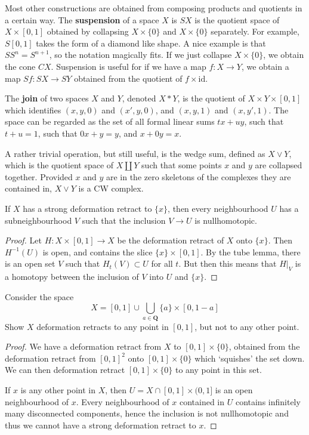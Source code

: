 Most other constructions are obtained from composing products and quotients in a certain way. The {\bf suspension} of a space $X$ is $SX$ is the quotient space of $X \times [0,1]$ obtained by collapsing $X \times \{ 0 \}$ and $X \times \{ 0 \}$ separately. For example, $S[0,1]$ takes the form of a diamond like shape. A nice example is that $SS^n = S^{n+1}$, so the notation magically fits. If we just collapse $X \times \{ 0 \}$, we obtain the cone $CX$. Suspension is useful for if we have a map $f:X \to Y$, we obtain a map $Sf: SX \to SY$ obtained from the quotient of $f \times \text{id}$.

The {\bf join} of two spaces $X$ and $Y$, denoted $X*Y$, is the quotient of $X \times Y \times [0,1]$ which identifies $(x,y,0)$ and $(x',y,0)$, and $(x,y,1)$ and $(x,y',1)$. The space can be regarded as the set of all formal linear sums $tx + uy$, such that $t + u = 1$, such that $0x + y = y$, and $x + 0y = x$.

A rather trivial operation, but still useful, is the wedge sum, defined as $X \vee Y$, which is the quotient space of $X \coprod Y$ such that some points $x$ and $y$ are collapsed together. Provided $x$ and $y$ are in the zero skeletons of the complexes they are contained in, $X \vee Y$ is a CW complex.











\begin{theorem}
    If $X$ has a strong deformation retract to $\{ x \}$, then every neighbourhood $U$ has a subneighbourhood $V$ such that the inclusion $V \to U$ is nullhomotopic.
\end{theorem}
\begin{proof}
    Let $H: X \times [0,1] \to X$ be the deformation retract of $X$ onto $\{ x \}$. Then $H^{-1}(U)$ is open, and contains the slice $\{ x \} \times [0,1]$. By the tube lemma, there is an open set $V$ such that $H_t(V) \subset U$ for all $t$. But then this means that $H|_V$ is a homotopy between the inclusion of $V$ into $U$ and $\{ x \}$.
\end{proof}

\begin{theorem}
    Consider the space
    \[ X = [0,1] \cup \bigcup_{a \in \mathbf{Q}} \{ a \} \times [0,1-a] \]
    Show $X$ deformation retracts to any point in $[0,1]$, but not to any other point.
\end{theorem}
\begin{proof}
    We have a deformation retract from $X$ to $[0,1] \times \{ 0 \}$, obtained from the deformation retract from $[0,1]^2$ onto $[0,1] \times \{ 0 \}$ which `squishes' the set down. We can then deformation retract $[0,1] \times \{ 0 \}$ to any point in this set.

    If $x$ is any other point in $X$, then $U = X \cap [0,1] \times (0,1]$ is an open neighbourhood of $x$. Every neighbourhood of $x$ contained in $U$ contains infinitely many disconnected components, hence the inclusion is not nullhomotopic and thus we cannot have a strong deformation retract to $x$.
\end{proof}